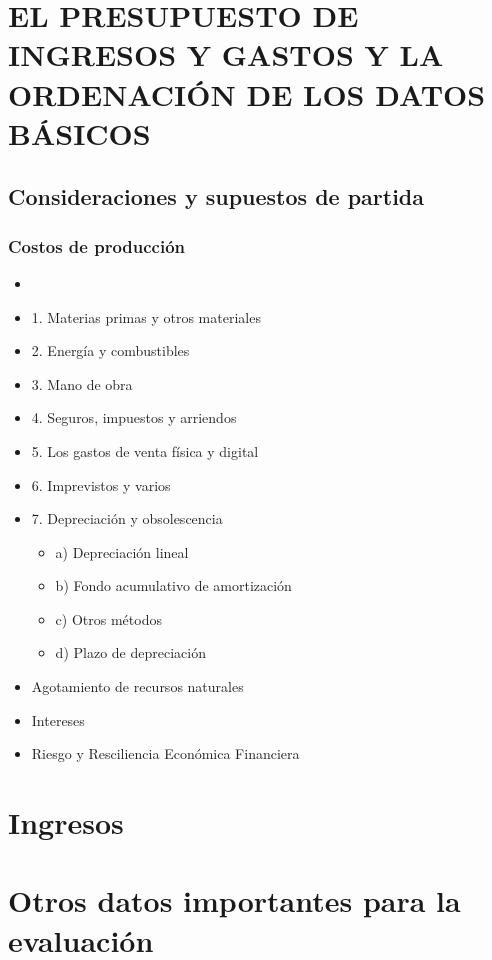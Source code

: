 \documentclass[crop=false]{standalone}
\begin{document}
\section{EL PRESUPUESTO DE INGRESOS Y GASTOS Y LA ORDENACIÓN DE LOS DATOS BÁSICOS}

\subsection{Consideraciones y supuestos de partida}

\subsubsection{Costos de producción}

\begin{itemize}
    \item 
    \item 1. Materias primas y otros materiales
    \item 2. Energía y combustibles
    \item 3. Mano de obra
    \item 4. Seguros, impuestos y arriendos
    \item 5. Los gastos de venta física y digital
    \item 6. Imprevistos y varios
    \item 7. Depreciación y obsolescencia


\begin{itemize}
    \item a) Depreciación lineal
    \item b) Fondo acumulativo de amortización
    \item c) Otros métodos
    \item d) Plazo de depreciación
    
\end{itemize}


\item Agotamiento de recursos naturales
\item Intereses
\item Riesgo y Resciliencia Económica Financiera
    
\end{itemize}


\section{Ingresos}

\section{Otros datos importantes para la evaluación}
\end{document}
